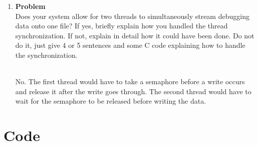 \documentclass[12pt]{article}
\newenvironment{Ex}{\textbf{Problem}\vspace{.25em}\\}{}
\newcommand{\todo}{\hfill{\LARGE \emph{\color{red}TODO}}}
\newcommand{\hbr}{\hfill\vspace{.25em}\\}
\begin{document}
\begin{enumerate}
\begin{Ex}
\begin{solution}
      \todo
    \end{solution}
  \end{Ex}
\item
  \begin{Ex}
    Does your system allow for two threads to simultaneously stream
    debugging data onto one file? If yes, briefly explain how you
    handled the thread synchronization. If not, explain in detail how
    it could have been done. Do not do it, just give 4 or 5 sentences
    and some C code explaining how to handle the synchronization.
    \begin{solution} \hbr
    No. The first thread would have to take a semaphore before a write
    occurs and release it after the write goes through. The second
    thread would have to wait for the semaphore to be released before
    writing the data.
    \end{solution}
  \end{Ex}
\end{enumerate}

\newpage
\section{Code}






\end{document}
